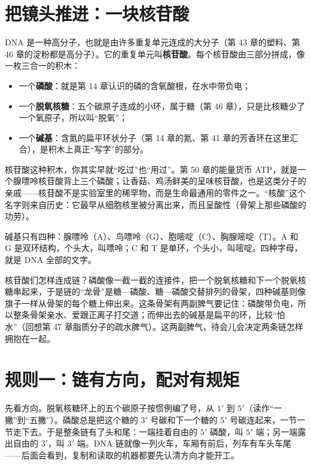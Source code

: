 \section{把镜头推进：一块核苷酸}

DNA 是一种高分子，也就是由许多重复单元连成的大分子（第 43 章的塑料、第 46 章的淀粉都是高分子）。它的重复单元叫\textbf{核苷酸}。每个核苷酸由三部分拼成，像一枚三合一的积木：

\begin{itemize}[itemsep=2pt]
\item 一个\textbf{磷酸}：就是第 14 章认识的磷的含氧酸根，在水中带负电；
\item 一个\textbf{脱氧核糖}：五个碳原子连成的小环，属于糖（第 46 章），只是比核糖少了一个氧原子，所以叫“脱氧”；
\item 一个\textbf{碱基}：含氮的扁平环状分子（第 14 章的氮、第 41 章的芳香环在这里汇合），是积木上真正“写字”的部分。
\end{itemize}

核苷酸这种积木，你其实早就“吃过”也“用过”。第 50 章的能量货币 ATP，就是一个腺嘌呤核苷酸背上三个磷酸；让香菇、鸡汤鲜美的呈味核苷酸，也是这类分子的亲戚——核苷酸不是实验室里的稀罕物，而是生命最通用的零件之一。“核酸”这个名字则来自历史：它最早从细胞核里被分离出来，而且呈酸性（骨架上那些磷酸的功劳）。

碱基只有四种：腺嘌呤（A）、鸟嘌呤（G）、胞嘧啶（C）、胸腺嘧啶（T）。A 和 G 是双环结构，个头大，叫嘌呤；C 和 T 是单环，个头小，叫嘧啶。四种字母，就是 DNA 全部的文字。

核苷酸们怎样连成链？磷酸像一截一截的连接件，把一个脱氧核糖和下一个脱氧核糖串起来，于是链的“龙骨”是糖—磷酸、糖—磷酸交替排列的骨架，四种碱基则像旗子一样从骨架的每个糖上伸出来。这条骨架有两副脾气要记住：磷酸带负电，所以整条骨架亲水、爱跟正离子打交道；而伸出去的碱基是扁平的环，比较“怕水”（回想第 47 章脂质分子的疏水脾气）。这两副脾气，待会儿会决定两条链怎样拥抱在一起。

\section{规则一：链有方向，配对有规矩}

先看方向。脱氧核糖环上的五个碳原子按惯例编了号，从 $1'$ 到 $5'$（读作“一撇”到“五撇”）。磷酸总是把这个糖的 $3'$ 号碳和下一个糖的 $5'$ 号碳连起来，一节一节走下去。于是整条链有了头和尾：一端挂着自由的 $5'$ 磷酸，叫 $5'$ 端；另一端露出自由的 $3'$，叫 $3'$ 端。DNA 链就像一列火车，车厢有前后，列车有车头车尾——后面会看到，复制和读取的机器都要先认清方向才能开工。

